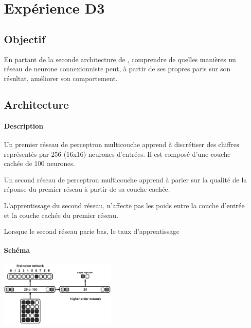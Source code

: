 \section{Expérience D3} 
  \subsection{Objectif}
    En partant de la seconde architecture de \cite{Cleeremans_2007}, 
    comprendre de quelles manières un réseau de neurone connexionniste peut, à partir de ses propres paris
    sur son résultat, améliorer son comportement.
  
  
  \subsection{Architecture}
    \paragraph{Description}
      Un premier réseau de perceptron multicouche apprend à discrétiser des chiffres représentés
      par 256 (16x16) neurones d'entrées. Il est composé d'une couche cachée de 100 neurones.
      
      Un second réseau de perceptron multicouche apprend à parier sur la qualité de la réponse
      du premier réseau à partir de sa couche cachée.
      
      L'apprentissage du second réseau, n'affecte pas les poids entre la couche d'entrée et la 
      couche cachée du premier réseau.
      
      Lorsque le second réseau parie bas, le taux d'apprentissage 

    \paragraph{Schéma}
      \begin{center}
	\includegraphics[width=220px]{data/expC1/schema.png}
      \end{center}
      
